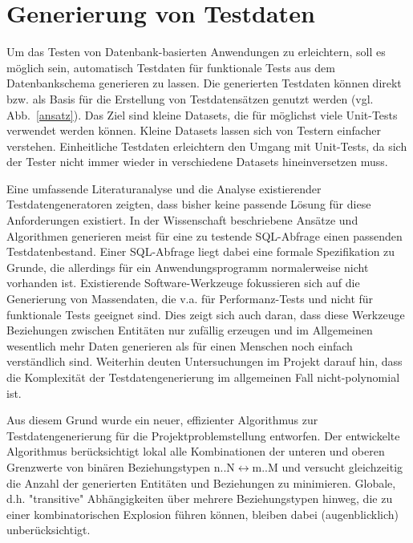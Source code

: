 \section{Generierung von Testdaten}

Um das Testen von Datenbank-basierten Anwendungen zu erleichtern, soll es möglich sein, automatisch Testdaten für funktionale Tests aus dem Datenbankschema generieren zu lassen. Die generierten Testdaten können direkt bzw. als Basis für die Erstellung von Testdatensätzen genutzt werden (vgl. Abb.~\ref{ansatz}). Das Ziel sind kleine Datasets, die für möglichst viele Unit-Tests verwendet werden können. Kleine Datasets lassen sich von Testern einfacher verstehen. Einheitliche Testdaten erleichtern den Umgang mit Unit-Tests, da sich der Tester nicht immer wieder in verschiedene Datasets hineinversetzen muss.

Eine umfassende Literaturanalyse und die Analyse existierender Testdatengeneratoren zeigten, dass bisher keine passende Lösung für diese Anforderungen existiert. 
In der Wissenschaft beschriebene Ansätze und Algorithmen generieren meist für eine zu testende SQL-Abfrage einen passenden Testdatenbestand. Einer SQL-Abfrage liegt dabei eine formale Spezifikation zu Grunde, die allerdings für ein Anwendungsprogramm normalerweise nicht vorhanden ist. Existierende Software-Werkzeuge fokussieren sich auf die Generierung von Massendaten, die v.a. für Performanz-Tests und nicht für funktionale Tests geeignet sind. Dies zeigt sich auch daran, dass diese Werkzeuge Beziehungen zwischen Entitäten nur zufällig erzeugen und im Allgemeinen wesentlich mehr Daten generieren als für einen Menschen noch einfach verständlich sind. Weiterhin deuten Untersuchungen im Projekt darauf hin, dass die Komplexität der Testdatengenerierung im allgemeinen Fall nicht-polynomial ist.

Aus diesem Grund wurde ein neuer, effizienter Algorithmus zur Testdatengenerierung für die Projektproblemstellung entworfen. 
Der entwickelte Algorithmus berücksichtigt lokal alle Kombinationen der unteren und oberen Grenzwerte von binären Beziehungstypen n..N$\leftrightarrow$m..M und versucht gleichzeitig die Anzahl der generierten Entitäten und Beziehungen zu minimieren. Globale, d.h. "transitive" Abhängigkeiten über mehrere Beziehungstypen hinweg, die zu einer kombinatorischen Explosion führen können, bleiben dabei (augenblicklich) unberücksichtigt. 

%

